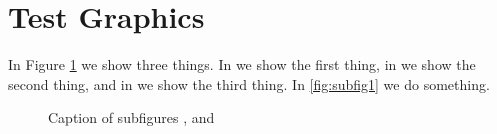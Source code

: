 \documentclass[10pt]{article}
\begin{document}
  \section{Test Graphics}
    In Figure \ref{fig:subfigureExample} we show three things. In  we show the first thing, in  we show the second thing, and in  we show the third thing. In \ref{fig:subfig1} we do something.

  \begin{figure}[!ht]
    \centering
    \caption[Optional caption for list of figures]{Caption of subfigures ,  and }\label{fig:subfigureExample}
  \end{figure}
\end{document}
